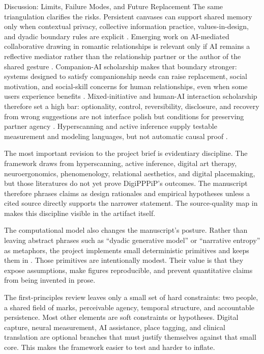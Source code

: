 \documentclass[
  ignorenonframetext,
]{beamer}
\begin{document}
\begin{frame}[allowframebreaks]{Discussion: Limits, Failure Modes, and
Future Replacement}
The same triangulation clarifies the risks. Persistent canvases can
support shared memory only when contextual privacy, collective
information practice, values-in-design, and dyadic boundary rules are
explicit .
Emerging work on AI-mediated collaborative drawing in romantic
relationships is relevant only if AI remains a reflective mediator
rather than the relationship partner or the author of the shared gesture
. Companion-AI scholarship makes that boundary
stronger: systems designed to satisfy companionship needs can raise
replacement, social motivation, and social-skill concerns for human
relationships, even when some users experience benefits
. Mixed-initiative and human-AI
interaction scholarship therefore set a high bar: optionality, control,
reversibility, disclosure, and recovery from wrong suggestions are not
interface polish but conditions for preserving partner agency
. Hyperscanning and active inference supply
testable measurement and modeling languages, but not automatic causal
proof .

The most important revision to the project brief is evidentiary
discipline. The framework draws from hyperscanning, active inference,
digital art therapy, neuroergonomics, phenomenology, relational
aesthetics, and digital placemaking, but those literatures do not yet
prove DigiPPPiP's outcomes. The manuscript therefore phrases claims as
design rationales and empirical hypotheses unless a cited source
directly supports the narrower statement. The source-quality map in
 makes this discipline visible in the
artifact itself.

The computational model also changes the manuscript's posture. Rather
than leaving abstract phrases such as ``dyadic generative model'' or
``narrative entropy'' as metaphors, the project implements small
deterministic primitives and keeps them in
. Those primitives are intentionally
modest. Their value is that they expose assumptions, make figures
reproducible, and prevent quantitative claims from being invented in
prose.

The first-principles review leaves only a small set of hard constraints:
two people, a shared field of marks, perceivable agency, temporal
structure, and accountable persistence. Most other elements are soft
constraints or hypotheses. Digital capture, neural measurement, AI
assistance, place tagging, and clinical translation are optional
branches that must justify themselves against that small core. This
makes the framework easier to test and harder to inflate.


\end{frame}
\end{document}
